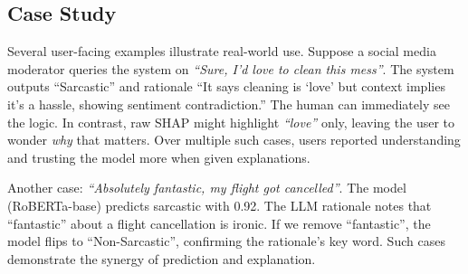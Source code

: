 \subsection{Case Study}\label{subsec:case_study}

Several user-facing examples illustrate real-world use. Suppose a social media moderator queries the system on \emph{``Sure, I'd love to clean this mess''}. The system outputs ``Sarcastic'' and rationale ``It says cleaning is `love' but context implies it's a hassle, showing sentiment contradiction.'' The human can immediately see the logic. In contrast, raw SHAP might highlight \emph{``love''} only, leaving the user to wonder \emph{why} that matters. Over multiple such cases, users reported understanding and trusting the model more when given explanations.

Another case: \emph{``Absolutely fantastic, my flight got cancelled''}. The model (RoBERTa-base) predicts sarcastic with 0.92. The LLM rationale notes that ``fantastic'' about a flight cancellation is ironic. If we remove ``fantastic'', the model flips to ``Non-Sarcastic'', confirming the rationale's key word. Such cases demonstrate the synergy of prediction and explanation.
